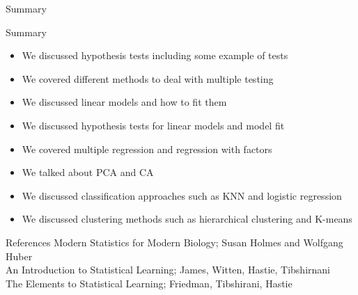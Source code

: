 \documentclass{bredelebeamer}
\begin{document}
\begin{frame}{Summary}
\begin{exampleblock}{Summary}

\begin{itemize}
\item We discussed hypothesis tests including some example of tests
\item We covered different methods to deal with multiple testing
\item We discussed linear models and how to fit them
\item We discussed hypothesis tests for linear models and model fit
\item We covered multiple regression and regression with factors
\item We talked about PCA and CA
\item We discussed classification approaches such as KNN and logistic regression
\item We discussed clustering methods such as hierarchical clustering and K-means
\end{itemize}
\end{exampleblock}
\end{frame}

\begin{frame}{References}
Modern Statistics for Modern Biology; Susan Holmes and Wolfgang Huber
\\
An Introduction to Statistical Learning; James, Witten, Hastie, Tibshirnani
\\
The Elements to Statistical Learning; Friedman, Tibshirani, Hastie
\end{frame}
\end{document}
